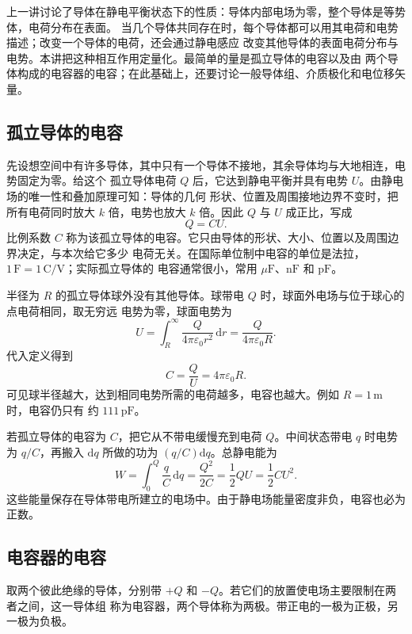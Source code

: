 上一讲讨论了导体在静电平衡状态下的性质：导体内部电场为零，整个导体是等势体，电荷分布在表面。
当几个导体共同存在时，每个导体都可以用其电荷和电势描述；改变一个导体的电荷，还会通过静电感应
改变其他导体的表面电荷分布与电势。本讲把这种相互作用定量化。最简单的量是孤立导体的电容以及由
两个导体构成的电容器的电容；在此基础上，还要讨论一般导体组、介质极化和电位移矢量。

\subsection*{孤立导体的电容}

先设想空间中有许多导体，其中只有一个导体不接地，其余导体均与大地相连，电势固定为零。给这个
孤立导体电荷 $Q$ 后，它达到静电平衡并具有电势 $U$。由静电场的唯一性和叠加原理可知：导体的几何
形状、位置及周围接地边界不变时，把所有电荷同时放大 $k$ 倍，电势也放大 $k$ 倍。因此 $Q$ 与 $U$
成正比，写成
\begin{equation}
  \boxed{Q=CU}.
\end{equation}
比例系数 $C$ 称为该孤立导体的电容。它只由导体的形状、大小、位置以及周围边界决定，与本次给它多少
电荷无关。在国际单位制中电容的单位是法拉，$1\,\mathrm F=1\,\mathrm C/\mathrm V$；实际孤立导体的
电容通常很小，常用 $\mu\mathrm F$、$\mathrm{nF}$ 和 $\mathrm{pF}$。

半径为 $R$ 的孤立导体球外没有其他导体。球带电 $Q$ 时，球面外电场与位于球心的点电荷相同，取无穷远
电势为零，球面电势为
\[
  U=\int_R^{\infty}\frac{Q}{4\pi\varepsilon_0r^2}\,\mathrm dr
   =\frac{Q}{4\pi\varepsilon_0R}.
\]
代入定义得到
\begin{equation}
  \boxed{C=\frac QU=4\pi\varepsilon_0R}.
\end{equation}
可见球半径越大，达到相同电势所需的电荷越多，电容也越大。例如 $R=1\,\mathrm m$ 时，电容仍只有
约 $111\,\mathrm{pF}$。

若孤立导体的电容为 $C$，把它从不带电缓慢充到电荷 $Q$。中间状态带电 $q$ 时电势为 $q/C$，再搬入
$\mathrm dq$ 所做的功为 $(q/C)\mathrm dq$。总静电能为
\begin{equation}
  \boxed{W=\int_0^Q\frac qC\,\mathrm dq
  =\frac{Q^2}{2C}=\frac12QU=\frac12CU^2}.
\end{equation}
这些能量保存在导体带电所建立的电场中。由于静电场能量密度非负，电容也必为正数。

\subsection*{电容器的电容}

取两个彼此绝缘的导体，分别带 $+Q$ 和 $-Q$。若它们的放置使电场主要限制在两者之间，这一导体组
称为电容器，两个导体称为两极。带正电的一极为正极，另一极为负极。


